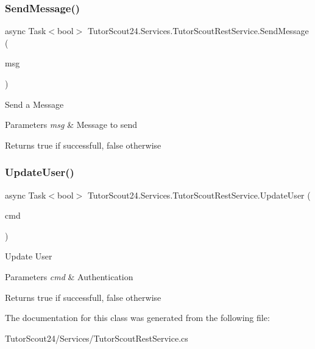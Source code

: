 \subsubsection{\texorpdfstring{Send\+Message()}{SendMessage()}}
{\footnotesize\ttfamily async Task$<$bool$>$ Tutor\+Scout24.\+Services.\+Tutor\+Scout\+Rest\+Service.\+Send\+Message (\begin{DoxyParamCaption}\item[{\mbox{\hyperlink{class_tutor_scout24_1_1_models_1_1_chat_1_1_send_message}{Send\+Message}}}]{msg }\end{DoxyParamCaption})\hspace{0.3cm}{\ttfamily [inline]}}



Send a Message 


\begin{DoxyParams}{Parameters}
{\em msg} & Message to send\\
\hline
\end{DoxyParams}
\begin{DoxyReturn}{Returns}
true if successfull, false otherwise
\end{DoxyReturn}
\mbox{\label{class_tutor_scout24_1_1_services_1_1_tutor_scout_rest_service_a6f94210e708fe30a18c712db702d13d9}} 
\subsubsection{\texorpdfstring{Update\+User()}{UpdateUser()}}
{\footnotesize\ttfamily async Task$<$bool$>$ Tutor\+Scout24.\+Services.\+Tutor\+Scout\+Rest\+Service.\+Update\+User (\begin{DoxyParamCaption}\item[{\mbox{\hyperlink{class_tutor_scout24_1_1_models_1_1_rest_command_with_authentication}{Rest\+Command\+With\+Authentication}}}]{cmd }\end{DoxyParamCaption})\hspace{0.3cm}{\ttfamily [inline]}}



Update User 


\begin{DoxyParams}{Parameters}
{\em cmd} & Authentication\\
\hline
\end{DoxyParams}
\begin{DoxyReturn}{Returns}
true if successfull, false otherwise
\end{DoxyReturn}


The documentation for this class was generated from the following file\+:\begin{DoxyCompactItemize}
\item 
Tutor\+Scout24/\+Services/Tutor\+Scout\+Rest\+Service.\+cs\end{DoxyCompactItemize}
